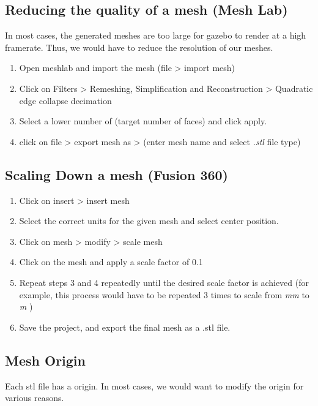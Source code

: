 \documentclass[11pt]{article}
\begin{document}
\subsection{Reducing the quality of a mesh (Mesh Lab)}
In most cases, the generated meshes are too large for gazebo to render at a high framerate. Thus, we would have to reduce the resolution of our meshes.
\begin{enumerate}
 \item {
       Open meshlab and import the mesh (file > import mesh)
       }
 \item{
       Click on Filters > Remeshing, Simplification and Reconstruction >  Quadratic edge collapse decimation
       }
 \item{
       Select a lower number of (target number of faces) and click apply.
       }
 \item{
       click on file > export mesh as > (enter mesh name and select \emph{.stl} file type)
       }
\end{enumerate}
\subsection{Scaling Down a mesh (Fusion 360) }
\begin{enumerate}
 \item {
       Click on insert > insert mesh
       }
 \item {
       Select the correct units for the given mesh and select center position.
       }
 \item {
       Click on mesh > modify > scale mesh
       }
 \item {
       Click on the mesh and apply a scale factor of 0.1
       }
 \item {
       Repeat steps 3 and 4 repeatedly until the desired scale factor is achieved (for example, this process would have to be repeated 3 times to scale from \emph{mm} to \emph{m} )
       }
 \item{
       Save the project, and export the final mesh as a .stl file.
       }
\end{enumerate}

\subsection{Mesh Origin}
Each stl file has a origin. In most cases, we would want to modify the origin for various reasons.
\end{document}
